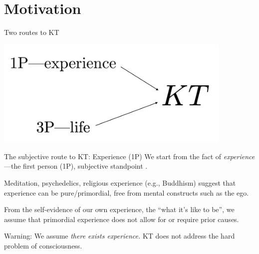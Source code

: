 




\section{Motivation}
\begin{frame}[label=intro30]{Two routes to KT}
 \begin{center}%
  \includegraphics[height=5.2cm]{img/KT.png}
  \end{center}
\end{frame}
\begin{frame}[label=intro]{The subjective route to KT: Experience (1P)}
	We start from the fact of {\em experience}---the first person (1P), subjective standpoint \citep{Ruffini2017}.  \vfill
	
	Meditation, psychedelics, religious experience (e.g., Buddhism) suggest that experience can be pure/primordial, free from mental constructs such as the ego.\vfill
	
	From the self-evidence of our own experience, the ``what it's like to be'', we assume that  primordial experience does not  allow for or require prior causes.\vfill
	
    \begin{alertblock}{Warning:  We assume {\em there exists experience.} } 
	KT does not address the hard problem of consciousness.  
	\end{alertblock}
	

\end{frame}

